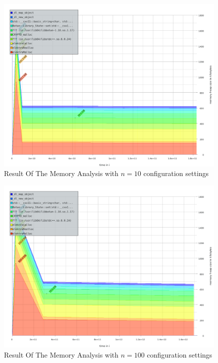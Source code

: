 \begin{figure}
\center
\caption{Result Of The Memory Analysis with $n = 10$ configuration settings}
\label{eval-massif-010}
\includegraphics[width=\columnwidth]{plots/massif_010.pdf}
\end{figure}

\begin{figure}
\center
\caption{Result Of The Memory Analysis with $n = 100$ configuration settings}
\label{eval-massif-100}
\includegraphics[width=\columnwidth]{plots/massif_100.pdf}
\end{figure}

